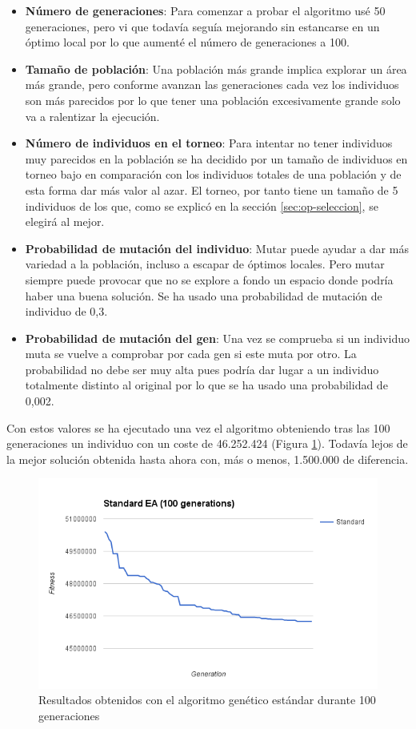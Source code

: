 \begin{itemize}
	\item \textbf{Número de generaciones}: Para comenzar a probar el algoritmo usé 50 generaciones, pero vi que todavía seguía mejorando sin estancarse en un óptimo local por lo que aumenté el número de generaciones a 100.
	\item \textbf{Tamaño de población}: Una población más grande implica explorar un área más grande, pero conforme avanzan las generaciones cada vez los individuos son más parecidos por lo que tener una población excesivamente grande solo va a ralentizar la ejecución.
	\item \textbf{Número de individuos en el torneo}: Para intentar no tener individuos muy parecidos en la población se ha decidido por un tamaño de individuos en torneo bajo en comparación con los individuos totales de una población y de esta forma dar más valor al azar. El torneo, por tanto tiene un tamaño de 5 individuos de los que, como se explicó en la sección \ref{sec:op-seleccion}, se elegirá al mejor.
	\item \textbf{Probabilidad de mutación del individuo}: Mutar puede ayudar a dar más variedad a la población, incluso a escapar de óptimos locales. Pero mutar siempre puede provocar que no se explore a fondo un espacio donde podría haber una buena solución. Se ha usado una probabilidad de mutación de individuo de 0,3.
	\item \textbf{Probabilidad de mutación del gen}: Una vez se comprueba si un individuo muta se vuelve a comprobar por cada gen si este muta por otro. La probabilidad no debe ser muy alta pues podría dar lugar a un individuo totalmente distinto al original por lo que se ha usado una probabilidad de 0,002.
\end{itemize}

Con estos valores se ha ejecutado una vez el algoritmo obteniendo tras las 100 generaciones un individuo con un coste de 46.252.424 (Figura \ref{fig:standard-ea}). Todavía lejos de la mejor solución obtenida hasta ahora con, más o menos, 1.500.000 de diferencia.

\begin{figure}[H]
	\centering
	\includegraphics[width=14cm]{img/standard-ea}
	\caption{Resultados obtenidos con el algoritmo genético estándar durante 100 generaciones}
	\label{fig:standard-ea}
\end{figure}

